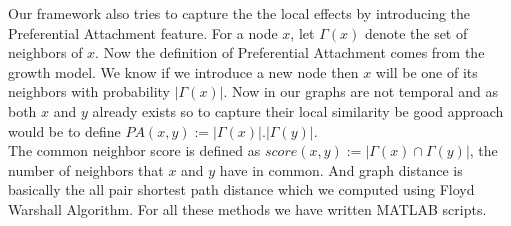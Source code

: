 Our framework also tries to capture the the local effects by introducing the Preferential Attachment feature. For a node $x$, let $\Gamma (x)$ denote the set of neighbors of $x$. Now the definition of Preferential Attachment comes from the growth model. We know if we introduce a new node then $x$ will be one of its neighbors with probability $|\Gamma(x)|$. Now in our graphs are not temporal and as both $x$ and $y$ already exists so to capture their local similarity be good approach would be to define $PA(x,y) := |\Gamma(x)|.|\Gamma(y)|$.
\\
The common neighbor score is defined as $score(x, y) := |\Gamma(x) \cap \Gamma(y)|$, the number of neighbors that $x$ and $y$ have in common. And graph distance is basically the all pair shortest path distance which we computed using Floyd Warshall Algorithm. For all these methods we have written MATLAB scripts.

